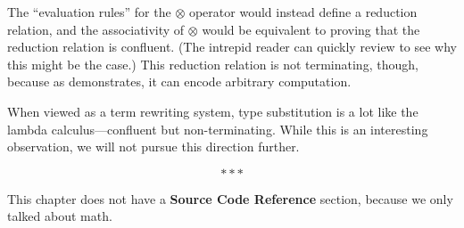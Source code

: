 \documentclass[../generics]{subfiles}
\begin{document}
The ``evaluation rules'' for the $\otimes$ operator would instead define a reduction relation, and the associativity of $\otimes$ would be equivalent to proving that the reduction relation is confluent. (The intrepid reader can quickly review  to see why this might be the case.) This reduction relation is not terminating, though, because as  demonstrates, it can encode arbitrary computation.

When viewed as a term rewriting system, type substitution is a lot like the lambda calculus---confluent but non-terminating. While this is an interesting observation, we will not pursue this direction further.

\begin{ceqn}
\[\ast \ast \ast\]
\end{ceqn}

This chapter does not have a \textbf{Source Code Reference} section, because we only talked about math.
\end{document}
